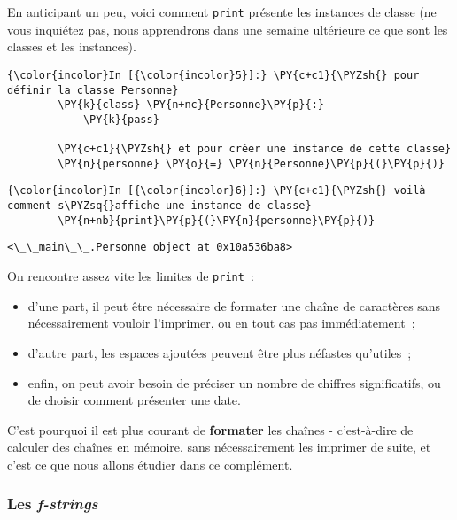     En anticipant un peu, voici comment \texttt{print} présente les
instances de classe (ne vous inquiétez pas, nous apprendrons dans une
semaine ultérieure ce que sont les classes et les instances).

    \begin{Verbatim}[commandchars=\\\{\}]
{\color{incolor}In [{\color{incolor}5}]:} \PY{c+c1}{\PYZsh{} pour définir la classe Personne}
        \PY{k}{class} \PY{n+nc}{Personne}\PY{p}{:}
            \PY{k}{pass}
        
        \PY{c+c1}{\PYZsh{} et pour créer une instance de cette classe}
        \PY{n}{personne} \PY{o}{=} \PY{n}{Personne}\PY{p}{(}\PY{p}{)}
\end{Verbatim}


    \begin{Verbatim}[commandchars=\\\{\}]
{\color{incolor}In [{\color{incolor}6}]:} \PY{c+c1}{\PYZsh{} voilà comment s\PYZsq{}affiche une instance de classe}
        \PY{n+nb}{print}\PY{p}{(}\PY{n}{personne}\PY{p}{)}
\end{Verbatim}


    \begin{Verbatim}[commandchars=\\\{\}]
<\_\_main\_\_.Personne object at 0x10a536ba8>

    \end{Verbatim}

    On rencontre assez vite les limites de \texttt{print}~:

\begin{itemize}
\tightlist
\item
  d'une part, il peut être nécessaire de formater une chaîne de
  caractères sans nécessairement vouloir l'imprimer, ou en tout cas pas
  immédiatement~;
\item
  d'autre part, les espaces ajoutées peuvent être plus néfastes
  qu'utiles~;
\item
  enfin, on peut avoir besoin de préciser un nombre de chiffres
  significatifs, ou de choisir comment présenter une date.
\end{itemize}

C'est pourquoi il est plus courant de \textbf{formater} les chaînes -
c'est-à-dire de calculer des chaînes en mémoire, sans nécessairement les
imprimer de suite, et c'est ce que nous allons étudier dans ce
complément.

    \hypertarget{les-f-strings}{%
\subsubsection{\texorpdfstring{Les
\emph{f-strings}}{Les f-strings}}\label{les-f-strings}}

